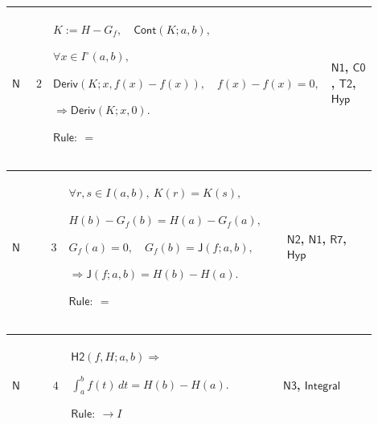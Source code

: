 \documentclass[12pt,reqno]{amsart}
\theoremstyle{blueplain}
\numberwithin{equation}{section}
\begin{document}
{\scriptsize \setlength{\parskip}{0pt}\nointerlineskip
\noindent 
\begin{tabular}{|@{}>{\centering\arraybackslash}m{0.10658\linewidth}|>{\centering\arraybackslash}m{0.03553\linewidth}|>{\centering\arraybackslash}m{0.52105\linewidth}|>{\centering\arraybackslash}m{0.23684\linewidth}|}
\hline
\hypertarget{proof:N2}{$\displaystyle \mathsf{N}$} & $\displaystyle 2$ & $%
\displaystyle K:=H-G_f,\quad\mathsf{Cont}(K;a,b),$\par$\displaystyle \forall
x\in I^\circ(a,b),$\par$\displaystyle \mathsf{Deriv}(K;x,f(x)-f(x)),\quad
f(x)-f(x)=0,$\par$\displaystyle \Rightarrow\mathsf{Deriv}(K;x,0).$\par$%
\displaystyle \mathsf{Rule}:\ =$ & \hyperlink{proof:N1}{$\displaystyle 
\mathsf{N1}$}, \hyperlink{proof:C0}{$\displaystyle \mathsf{C0}$}, \hyperlink{proof:T2}%
{$\displaystyle \mathsf{T2}$}, \hyperlink{def:Hyp}{$\displaystyle \mathsf{Hyp%
}$} \\ \hline
\end{tabular}%
}

{\scriptsize \setlength{\parskip}{0pt}\nointerlineskip
\noindent 
\begin{tabular}{|@{}>{\centering\arraybackslash}m{0.10658\linewidth}|>{\centering\arraybackslash}m{0.03553\linewidth}|>{\centering\arraybackslash}m{0.52105\linewidth}|>{\centering\arraybackslash}m{0.23684\linewidth}|}
\hline
\hypertarget{proof:N3}{$\displaystyle \mathsf{N}$} & $\displaystyle 3$ & $%
\displaystyle \forall r,s\in I(a,b),\ K(r)=K(s),$\par$\displaystyle %
H(b)-G_f(b)=H(a)-G_f(a),$\par$\displaystyle G_f(a)=0,\quad G_f(b)=\mathsf{J}%
(f;a,b),$\par$\displaystyle \Rightarrow\mathsf{J}(f;a,b)=H(b)-H(a).$\par$%
\displaystyle \mathsf{Rule}:\ =$ & \hyperlink{proof:N2}{$\displaystyle 
\mathsf{N2}$}, \hyperlink{proof:N1}{$\displaystyle \mathsf{N1}$}, \hyperlink{proof:R7}%
{$\displaystyle \mathsf{R7}$}, \hyperlink{def:Hyp}{$\displaystyle \mathsf{Hyp%
}$} \\ \hline
\end{tabular}%
}

{\scriptsize \setlength{\parskip}{0pt}\nointerlineskip
\noindent 
\begin{tabular}{|@{}>{\centering\arraybackslash}m{0.10658\linewidth}|>{\centering\arraybackslash}m{0.03553\linewidth}|>{\centering\arraybackslash}m{0.52105\linewidth}|>{\centering\arraybackslash}m{0.23684\linewidth}|}
\hline
\hypertarget{proof:N4}{$\displaystyle \mathsf{N}$} & $\displaystyle 4$ & $%
\displaystyle \mathsf{H2}(f,H;a,b)\Rightarrow$\par$\displaystyle \int_a^b
f(t)\,dt=H(b)-H(a).$\par$\displaystyle \mathsf{Rule}:\ \to I$ & \hyperlink{proof:N3}%
{$\displaystyle \mathsf{N3}$}, \hyperlink{def:Integral}{$\displaystyle 
\mathsf{Integral}$} \\ \hline
\end{tabular}%
}
\end{document}
